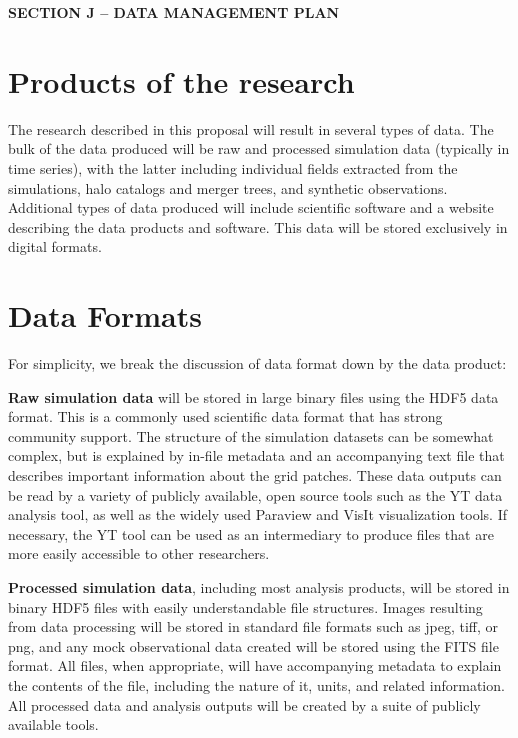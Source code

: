 \documentclass[11pt]{article}
\begin{document}

\vspace{-6mm}
\begin{center} 
\bfseries\uppercase{Section J -- data management plan}
\end{center}

\vspace{-3mm}
\section{Products of the research}
\vspace{-2mm}

The research described in this proposal will result in several types
of data.  The bulk of the data produced will be raw and processed
simulation data (typically in time series), with the latter including
individual fields extracted from the simulations, halo catalogs and
merger trees, and synthetic observations.
Additional types
of data produced will include scientific software and a website
describing the data products and software.  This data will be stored
exclusively in digital formats.
 
\vspace{-3mm}
\section{Data Formats}
\vspace{-2mm}

For simplicity, we break the discussion of data format down by the
data product:

\vspace{2mm}
\noindent \textbf{Raw simulation data} will be stored in large binary
files using the HDF5 data format.  This
is a commonly used scientific data format that has strong community
support.  The structure of the simulation datasets can be somewhat
complex, but is explained by in-file metadata and an accompanying text
 file that describes important information
about the grid patches.  These data outputs can be read by a variety
of publicly available, open source tools such as the YT data analysis
tool, as well as the widely used Paraview and
VisIt visualization tools.  If necessary, the YT tool can be used as
an intermediary to produce files that are more easily accessible to
other researchers.

\vspace{2mm}
\noindent \textbf{Processed simulation data}, including most analysis
products, will be stored in binary HDF5 files with easily
understandable file structures.  Images resulting from data processing will be stored in
standard file formats such as jpeg, tiff, or png, and any mock
observational data created will be stored using
the FITS file format.  All files, when appropriate, will have
accompanying metadata  to explain the contents of the file, including the
nature of it, units, and related information.  All processed data and
analysis outputs will be created by a suite of publicly available
tools.
\end{document}
